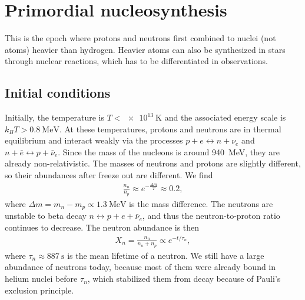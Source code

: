 \section{Primordial nucleosynthesis}

This is the epoch where protons and neutrons first combined to nuclei (not atoms) heavier than hydrogen. Heavier atoms can also be synthesized in stars through nuclear reactions, which has to be differentiated in observations.

\subsection{Initial conditions}

Initially, the temperature is $T < \SI{e13}{\kelvin}$ and the associated energy scale is $k_B T > \SI{0.8}{\MeV}$.
At these temperatures, protons and neutrons are in thermal equilibrium and interact weakly via the processes $p + e \leftrightarrow n + \nu_e$ and $n + \bar{e} \leftrightarrow p + \bar{\nu}_e$.
Since the mass of the nucleons is around \SI{940}{\MeV}, they are already non-relativistic.
The masses of neutrons and protons are slightly different, so their abundances after freeze out are different. We find
\begin{align*}
	\frac{n_n}{n_p} \approx e^{-\frac{\Delta m}{T}} \approx 0.2,
\end{align*}
where $\Delta m = m_n - m_p \propto \SI{1.3}{\MeV}$ is the mass difference.
The neutrons are unstable to beta decay $n \leftrightarrow p + e + \bar{\nu}_e$, and thus the neutron-to-proton ratio continues to decrease.
The neutron abundance is then
\begin{align*}
	X_n = \frac{n_n}{n_n + n_p} \propto e^{-t/\tau_n},
\end{align*}
where $\tau_n \approx \SI{887}{\second}$ is the mean lifetime of a neutron.
We still have a large abundance of neutrons today, because most of them were already bound in helium nuclei before $\tau_n$, which stabilized them from decay because of Pauli's exclusion principle.


